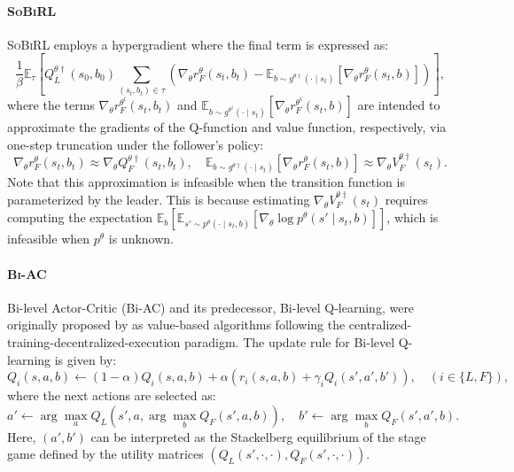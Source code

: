 \documentclass[letterpaper]{article} %
\providecommand{\E}{\mathbb{E}} %
\begin{document}
\paragraph{\textsc{SoBiRL}~\citep{Yang2025-lr}}
\textsc{SoBiRL} employs a hypergradient where the final term is expressed as:
\begin{equation}
    \dfrac{1}{\beta} \mathbb{E}_{\tau} \left[ Q_L^{\theta\dagger}(s_0, b_0) \sum_{(s_t, b_t) \in \tau} \left( \nabla_{\theta} r_F^{\theta}(s_t, b_t) - \mathbb{E}_{b \sim g^{\theta\dagger}(\cdot \mid s_t)} \left[ \nabla_{\theta} r_F^{\theta}(s_t, b) \right] \right) \right],
\end{equation}
where the terms $\nabla_{\theta} r_F^{\theta^i}(s_t, b_t)$ and $\mathbb{E}_{b \sim g^{\theta^\dagger}(\cdot \mid s_t)} \left[ \nabla_{\theta} r_F^{\theta^i}(s_t, b) \right]$  
are intended to approximate the gradients of the Q-function and value function, respectively, via one-step truncation under the follower’s policy:
\begin{equation}
    \nabla_{\theta} r_F^{\theta}(s_t, b_t) \approx \nabla_{\theta} Q_F^{\theta\dagger}(s_t, b_t), \quad
    \mathbb{E}_{b \sim g^{\theta\dagger}(\cdot \mid s_t)} \left[ \nabla_{\theta} r_F^{\theta}(s_t, b) \right] \approx \nabla_{\theta} V_F^{\theta\dagger}(s_t).
\end{equation}
Note that this approximation is infeasible when the transition function is parameterized by the leader.
This is because estimating $\nabla_{\theta}V_F^{\theta\dagger}(s_t)$ requires computing the expectation $\E_b\left[\E_{s'\sim p^{\theta}(\cdot\mid s_t,b)}\left[ \nabla_{\theta}\log p^{\theta}(s'\mid s_t,b) \right]\right]$, which is infeasible when $p^{\theta}$ is unknown.

\paragraph{\textsc{Bi-AC}~\citep{Zhang2020-hw}}
Bi-level Actor-Critic (Bi-AC) and its predecessor, Bi-level Q-learning, were originally proposed by \citet{Zhang2020-hw} as value-based algorithms following the centralized-training-decentralized-execution paradigm.  
The update rule for Bi-level Q-learning is given by:
\begin{equation}
Q_i(s, a, b) \gets (1 - \alpha) Q_i(s, a, b) + \alpha \left( r_i(s, a, b) + \gamma_i Q_i(s', a', b') \right), \quad (i \in \{L, F\}),
\end{equation}
where the next actions are selected as:
\begin{equation}
a' \gets \arg\max_{a} Q_L(s', a, \arg\max_{b} Q_F(s', a, b)), \quad
b' \gets \arg\max_{b} Q_F(s', a', b).
\end{equation}
Here, $(a', b')$ can be interpreted as the Stackelberg equilibrium of the stage game defined by the utility matrices $(Q_L(s', \cdot, \cdot), Q_F(s', \cdot, \cdot))$.
\end{document}

